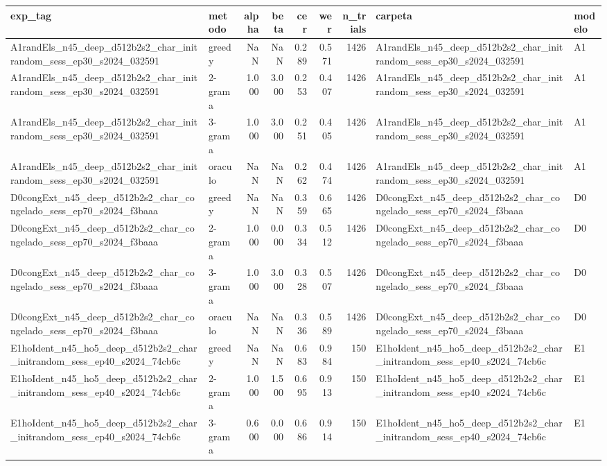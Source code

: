 \begin{tabular}{llrrrrrll}
\toprule
exp_tag & metodo & alpha & beta & cer & wer & n_trials & carpeta & modelo \\
\midrule
A1randEls_n45_deep_d512b2s2_char_initrandom_sess_ep30_s2024_032591 & greedy & NaN & NaN & 0.289 & 0.571 & 1426 & A1randEls_n45_deep_d512b2s2_char_initrandom_sess_ep30_s2024_032591 & A1 \\
A1randEls_n45_deep_d512b2s2_char_initrandom_sess_ep30_s2024_032591 & 2-grama & 1.000 & 3.000 & 0.253 & 0.407 & 1426 & A1randEls_n45_deep_d512b2s2_char_initrandom_sess_ep30_s2024_032591 & A1 \\
A1randEls_n45_deep_d512b2s2_char_initrandom_sess_ep30_s2024_032591 & 3-grama & 1.000 & 3.000 & 0.251 & 0.405 & 1426 & A1randEls_n45_deep_d512b2s2_char_initrandom_sess_ep30_s2024_032591 & A1 \\
A1randEls_n45_deep_d512b2s2_char_initrandom_sess_ep30_s2024_032591 & oraculo & NaN & NaN & 0.262 & 0.474 & 1426 & A1randEls_n45_deep_d512b2s2_char_initrandom_sess_ep30_s2024_032591 & A1 \\
D0congExt_n45_deep_d512b2s2_char_congelado_sess_ep70_s2024_f3baaa & greedy & NaN & NaN & 0.359 & 0.665 & 1426 & D0congExt_n45_deep_d512b2s2_char_congelado_sess_ep70_s2024_f3baaa & D0 \\
D0congExt_n45_deep_d512b2s2_char_congelado_sess_ep70_s2024_f3baaa & 2-grama & 1.000 & 0.000 & 0.334 & 0.512 & 1426 & D0congExt_n45_deep_d512b2s2_char_congelado_sess_ep70_s2024_f3baaa & D0 \\
D0congExt_n45_deep_d512b2s2_char_congelado_sess_ep70_s2024_f3baaa & 3-grama & 1.000 & 3.000 & 0.328 & 0.507 & 1426 & D0congExt_n45_deep_d512b2s2_char_congelado_sess_ep70_s2024_f3baaa & D0 \\
D0congExt_n45_deep_d512b2s2_char_congelado_sess_ep70_s2024_f3baaa & oraculo & NaN & NaN & 0.336 & 0.589 & 1426 & D0congExt_n45_deep_d512b2s2_char_congelado_sess_ep70_s2024_f3baaa & D0 \\
E1hoIdent_n45_ho5_deep_d512b2s2_char_initrandom_sess_ep40_s2024_74cb6c & greedy & NaN & NaN & 0.683 & 0.984 & 150 & E1hoIdent_n45_ho5_deep_d512b2s2_char_initrandom_sess_ep40_s2024_74cb6c & E1 \\
E1hoIdent_n45_ho5_deep_d512b2s2_char_initrandom_sess_ep40_s2024_74cb6c & 2-grama & 1.000 & 1.500 & 0.695 & 0.913 & 150 & E1hoIdent_n45_ho5_deep_d512b2s2_char_initrandom_sess_ep40_s2024_74cb6c & E1 \\
E1hoIdent_n45_ho5_deep_d512b2s2_char_initrandom_sess_ep40_s2024_74cb6c & 3-grama & 0.600 & 0.000 & 0.686 & 0.914 & 150 & E1hoIdent_n45_ho5_deep_d512b2s2_char_initrandom_sess_ep40_s2024_74cb6c & E1 \\

\end{tabular}
